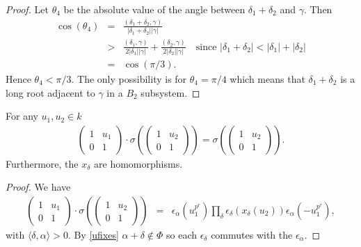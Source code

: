 \begin{proof}
Let $\theta_4$ be the absolute value of the angle between $\delta_1+\delta_2$ and $\gamma$. Then
\begin{eqnarray*}
\cos(\theta_4) &=& \frac{(\delta_1 + \delta_2, \gamma)}{|\delta_1+ \delta_2||\gamma|}\\
&>&\frac{(\delta_1, \gamma)}{2|\delta_1||\gamma|} + \frac{(\delta_2, \gamma)}{2|\delta_2||\gamma|}\quad\textrm{since }|\delta_1+\delta_2| < |\delta_1| + |\delta_2|\\
&=& \cos(\pi/3).
\end{eqnarray*}
Hence $\theta_4<\pi/3$. The only possibility is for $\theta_4 = \pi/4$ which means that $\delta_1+\delta_2$ is a long root adjacent to $\gamma$ in a $B_2$ subsystem. 
\end{proof}

\begin{corollary}\label{uact} For any $u_1, u_2 \in k$
\begin{eqnarray*}
\left(\begin{matrix}1 & u_1 \\ 0 & 1 \end{matrix}\right)
\cdot
\sigma\left(\left(\begin{matrix} 1 & u_2 \\ 0 & 1\end{matrix}\right)\right)
=
\sigma\left(\left(\begin{matrix} 1 & u_2 \\ 0 & 1\end{matrix}\right)\right).
\end{eqnarray*}
Furthermore, the $x_\delta$ are homomorphisms.
\end{corollary}

\begin{proof}
We have
\begin{eqnarray*}
\left(\begin{matrix}1 & u_1 \\ 0 & 1 \end{matrix}\right)
\cdot
\sigma\left(\left(\begin{matrix} 1 & u_2 \\ 0 & 1\end{matrix}\right)\right)
&=&
\epsilon_\alpha\left(u_1^{p^r}\right) \prod_\delta \epsilon_\delta\left(x_\delta\left(u_2\right)\right) \epsilon_\alpha\left(-u_1^{p^r}\right),
\end{eqnarray*}
with $\langle \delta, \alpha \rangle > 0$. By \ref{ufixes} $\alpha + \delta \notin \Phi$ so each $\epsilon_\delta$ commutes with the $\epsilon_\alpha$.
\end{proof}

